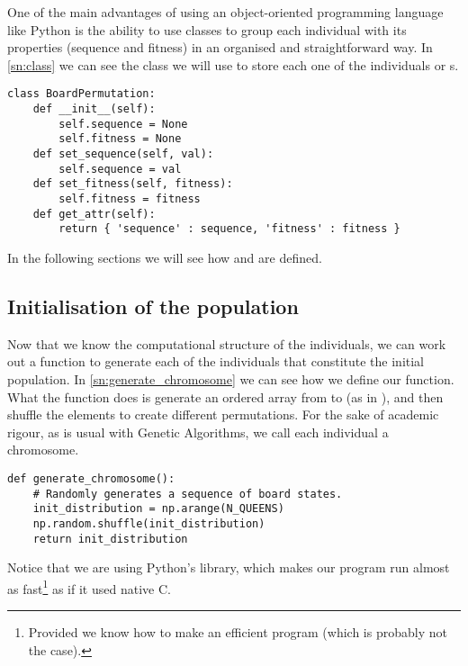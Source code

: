 One of the main advantages of using an object-oriented programming language like Python is the ability to use classes to group each individual with its properties (sequence and fitness) in an organised and straightforward way. In \cref{sn:class} we can see the  class we will use to store each one of the individuals or s.

\begin{lstlisting}[label=sn:class, caption=Definition of the \inline{BoardPermutation} class]
class BoardPermutation:
	def __init__(self):
		self.sequence = None
		self.fitness = None
	def set_sequence(self, val):
		self.sequence = val
	def set_fitness(self, fitness):
		self.fitness = fitness
	def get_attr(self):
		return { 'sequence' : sequence, 'fitness' : fitness }
\end{lstlisting}

In the following sections we will see how  and  are defined.

\subsection{Initialisation of the population}\label{sec:init}

Now that we know the computational structure of the individuals, we can work out a function to generate each of the individuals that constitute the initial population. In \cref{sn:generate_chromosome} we can see how we define our  function. What the function does is generate an ordered array from  to  (as in \inline{[0 1 2 3 ... N_QUEENS]}), and then shuffle the elements to create different permutations. For the sake of academic rigour, as is usual with Genetic Algorithms, we call each individual a chromosome.

\begin{lstlisting}[label=sn:generate_chromosome, caption=Function to generate a single individual]
def generate_chromosome():
	# Randomly generates a sequence of board states.
	init_distribution = np.arange(N_QUEENS)
	np.random.shuffle(init_distribution)
	return init_distribution
\end{lstlisting}

Notice that we are using Python's  library, which makes our program run almost as fast\footnote{Provided we know how to make an efficient program (which is probably not the case).} as if it used native C. %

